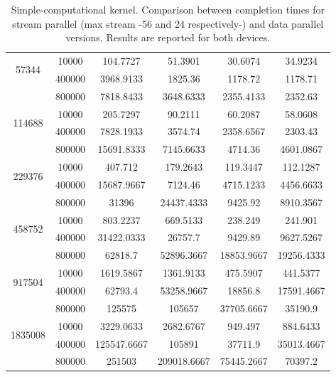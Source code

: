 \begin{itemize}
\begin{table}
\begin{tabular}{ | c  c || c | c  || c | c || }
			\multirow{2}{*}{57344}&	10000&	104.7727&	51.3901&	30.6074&	34.9234\\
			&	400000&	3968.9133&	1825.36&	1178.72&	1178.71\\
			&	800000&	7818.8433&	3648.6333&	2355.4133&	2352.63\\
			\hline
			\multirow{2}{*}{114688}&	10000&	205.7297&	90.2111&	60.2087&	58.0608\\
			&	400000&	7828.1933&	3574.74&	2358.6567&	2303.43\\
			&	800000&	15691.8333&	7145.6633&	4714.36&	4601.0867\\
			\hline
			\multirow{2}{*}{229376}&	10000&	407.712&	179.2643&	119.3447&	112.1287\\
			&	400000&	15687.9667&	7124.46&	4715.1233&	4456.6633\\
			&	800000&	31396&	24437.4333&	9425.92&	8910.3567\\
			\hline
			\multirow{2}{*}{458752}&	10000&	803.2237&	669.5133&	238.249&	241.901\\
			&	400000&	31422.0333&	26757.7&	9429.89&	9627.5267\\
			&	800000&	62818.7&	52896.3667&	18853.9667&	19256.4333\\
			\hline
			\multirow{2}{*}{917504}&	10000&	1619.5867&	1361.9133&	475.5907&	441.5377\\
			&	400000&	62793.4&	53258.9667&	18856.8&	17591.4667\\
			&	800000&	125575&	105657&	37705.6667&	35190.9\\
			\hline
			\multirow{2}{*}{1835008}&	10000&	3229.0633&	2682.6767&	949.497&	884.6433\\
			&	400000&	125547.6667&	105891&	37711.9&	35013.4667\\
			&	800000&	251503&	209018.6667&	75445.2667&	70397.2\\

			\hline

		\end{tabular}
		\caption{Simple-computational kernel. Comparison between completion times for stream parallel (max stream -56 and 24 respectively-) and data parallel versions. Results are reported for both devices.}	
		\label{tab:cosdataparVSsm}		
	\end{table}
	

\end{itemize}

